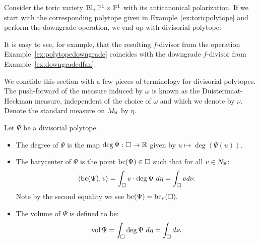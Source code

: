 \begin{example}
Consider the toric variety \(\operatorname{Bl}_z \mathbb{P}^1 \times \mathbb{P}^1\) with its anticanonical polarization. If we start with the corresponding polytope given in Example~\ref{ex:toricpolytope} and perform the downgrade operation, we end up with divisorial polytope:

\begin{figure}[H]
\centering

\label{fig:data230b}
\end{figure}

It is easy to see, for example, that the resulting \(f\)-divisor from the operation Example~\ref{ex:polytopedowngrade} coincides with the downgrade \(f\)-divisor from Example~\ref{ex:downgradedfan}.
\end{example}
We conclide this section with a few pieces of terminology for divisorial polytopes. The push-forward of the measure induced by \(\omega\) is known as the Duistermaat-Heckman measure, independent of the choice of \(\omega\) and which we denote by \(\nu\). Denote the standard measure on \(M_{\mathbb{R}}\) by \(\eta\).

\begin{definition}
Let \(\Psi\) be a divisorial polytope.
\begin{itemize}
\item The degree of \(\Psi\) is the map \( \deg \Psi : \Box \to \mathbb{R}\) given by \( u \mapsto \deg (\Psi(u))\).
\item The barycenter of \(\Psi\) is the point \(\mathop{\rm bc}\nolimits(\Psi) \in \Box\) such that for all \(v \in N_{\mathbb{R}}\):
\[
\langle \mathop{\rm bc}\nolimits(\Psi), v \rangle = \int_\Box v \cdot \deg \Psi \ d \eta = \int_\Box v d \nu. 
\]
Note by the second equality we see \(\mathop{\rm bc}\nolimits(\Psi) = \mathop{\rm bc}\nolimits_\nu(\Box).\)
\item The volume of \(\Psi\) is defined to be:
\[
\mathop{\rm vol}\nolimits \Psi = \int_\Box \deg \Psi \ d \eta = \int_\Box d \nu.
\]
\end{itemize}
\end{definition}
